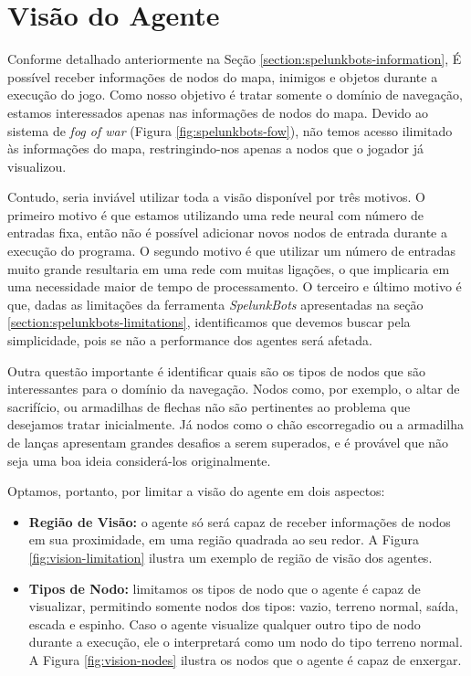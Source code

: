 \section{\label{section:modelling-vision}Visão do Agente}
Conforme detalhado anteriormente na Seção \ref{section:spelunkbots-information},
É possível receber informações de nodos do mapa, inimigos e objetos durante a
execução do jogo. Como nosso objetivo é tratar somente o domínio de navegação,
estamos interessados apenas nas informações de nodos do mapa. Devido ao sistema
de \textit{fog of war} (Figura \ref{fig:spelunkbots-fow}), não temos acesso
ilimitado às informações do mapa, restringindo-nos apenas a nodos que o jogador
já visualizou.

Contudo, seria inviável utilizar toda a visão disponível por três motivos. O
primeiro motivo é que estamos utilizando uma rede neural com número de entradas
fixa, então não é possível adicionar novos nodos de entrada durante a execução
do programa. O segundo motivo é que utilizar um número de entradas muito grande
resultaria em uma rede com muitas ligações, o que implicaria em uma necessidade
maior de tempo de processamento. O terceiro e último motivo é que, dadas as
limitações da ferramenta \textit{SpelunkBots} apresentadas na seção
\ref{section:spelunkbots-limitations}, identificamos que devemos buscar pela
simplicidade, pois se não a performance dos agentes será afetada.

Outra questão importante é identificar quais são os tipos de nodos que são
interessantes para o domínio da navegação. Nodos como, por exemplo, o altar de
sacrifício, ou armadilhas de flechas não são pertinentes ao problema que
desejamos tratar inicialmente. Já nodos como o chão escorregadio ou a armadilha
de lanças apresentam grandes desafios a serem superados, e é provável que não
seja uma boa ideia considerá-los originalmente.

Optamos, portanto, por limitar a visão do agente em dois aspectos:

\begin{itemize}
	\item \textbf{Região de Visão:} o agente só será capaz de receber
		informações de nodos em sua proximidade, em uma região quadrada ao seu
		redor. A Figura \ref{fig:vision-limitation} ilustra um exemplo de região
		de visão dos agentes.

	\item \textbf{Tipos de Nodo:} limitamos os tipos de nodo que o agente é
		capaz de visualizar, permitindo somente nodos dos tipos: vazio, terreno
		normal, saída, escada e espinho. Caso o agente visualize qualquer outro
		tipo de nodo durante a execução, ele o interpretará como um nodo do tipo
		terreno normal. A Figura \ref{fig:vision-nodes} ilustra os nodos que o
		agente é capaz de enxergar.
\end{itemize}

